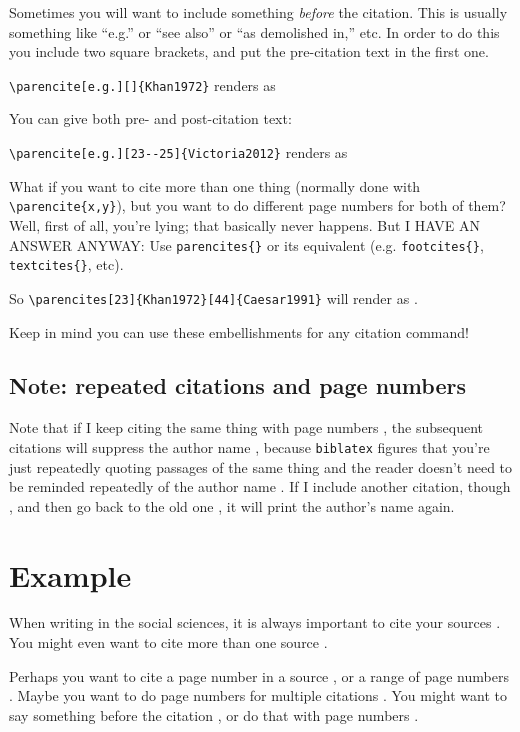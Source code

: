 \documentclass[12pt]{article}
\begin{document}
Sometimes you will want to include something {\em before} the citation. This is usually something like ``e.g.'' or ``see also'' or ``as demolished in,'' etc. In order to do this you include two square brackets, and put the pre-citation text in the first one.

\verb+\parencite[e.g.][]{Khan1972}+ renders as \parencite[e.g.][]{Khan1972}

You can give both pre- and post-citation text:

\verb+\parencite[e.g.][23--25]{Victoria2012}+ renders as \parencite[e.g.][23--25]{Victoria2012}

What if you want to cite more than one thing (normally done with \verb+\parencite{x,y}+), but you want to do different page numbers for both of them? Well, first of all, you're lying; that basically never happens. But I HAVE AN ANSWER ANYWAY: Use \verb+parencites{}+ or its equivalent (e.g. \verb+footcites{}+, \verb+textcites{}+, etc).

So \verb+\parencites[23]{Khan1972}[44]{Caesar1991}+ will render as \parencites[23]{Khan1972}[44]{Caesar1991}.

Keep in mind you can use these embellishments for any citation command!

\subsection{Note: repeated citations and page numbers}

Note that if I keep citing the same thing with page numbers \parencite[32]{Khan1972}, the subsequent citations will suppress the author name \parencite[55]{Khan1972}, because \verb+biblatex+ figures that you're just repeatedly quoting passages of the same thing and the reader doesn't need to be reminded repeatedly of the author name \parencite[102]{Khan1972}. If I include another citation, though \parencite[2--3]{Caesar1991}, and then go back to the old one \parencite[200]{Khan1972}, it will print the author's name again.

\section{Example}

When writing in the social sciences, it is always important to cite your sources \parencite{Khan1972}. You might even want to cite more than one source \parencite{Khan1972,Caesar1991}. 

Perhaps you want to cite a page number in a source \parencite[23]{Bonaparte1923}, or a range of page numbers \parencite[23--42]{Victoria2012}. Maybe you want to do page numbers for multiple citations \parencites[23]{Khan1972}[44]{Caesar1991}. You might want to say something before the citation \parencite[for example,][]{Khan1972}, or do that with page numbers \parencite[for example,][22]{Caesar1991}. 
\end{document}
